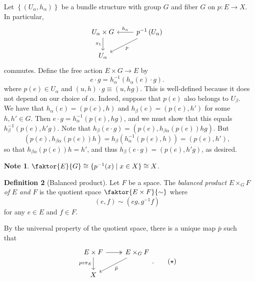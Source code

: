 \documentclass[10pt,letterpaper,cm]{nupset}
\theoremstyle{definition}
\newtheorem{defn}{Definition}[subsection]
\newtheorem{note}[defn]{Note}
\theoremstyle{theorem}
\theoremstyle{remark}
\newcommand{\1}{\mathbb{1}}
\newcommand{\0}{\vec 0}
\begin{document}
Let $\left\{\left(U_{\alpha}, h_{\alpha}\right)\right\}$ be a bundle structure with group $G$ and fiber $G$ on $p: E \to X$. In particular,
\[
\begin{tikzcd}
U_{\alpha}\times G \arrow[d, "\pi_1"'] & p^{-1}\left(U_{\alpha}\right) \arrow[l, "h_{\alpha}"'] \arrow[ld, "p"] \\
U_{\alpha}                             &                                                                                
\end{tikzcd}
\]
commutes. Define the free action $E \times G \to E$ by
\[
e\cdot g = h_{\alpha}^{-1}\left(h_{\alpha}(e)\cdot g\right).
\] where $p(e) \in U_{\alpha}$ and $(u,h) \cdot g \equiv \left(u, hg\right)$. This is well-defined because it does not depend on our choice of $\alpha$. Indeed, suppose that $p(e)$ also belongs to $U_{\beta}$. We have that $h_{\alpha}(e) =\left(p(e), h\right)$ and $h_{\beta}(e) = \left(p(e), h'\right)$ for some $h, h' \in G$. Then $e\cdot g = h_{\alpha}^{-1}\left(p(e), hg\right)$, and we must show that this equals $h_{\beta}^{-1}\left(p(e), h'g\right)$.  Note that $h_{\beta}\left(e\cdot g\right) = \left(p(e), h_{\beta{\alpha}}(p(e))hg\right)$.  But $$\left(p(e), h_{\beta{\alpha}}(p(e))h\right)  =  h_{\beta}\left(h_{\alpha}^{-1}\left(p(e), h\right)\right) = \left(p(e), h'\right),$$ 
so that $h_{\beta{\alpha}}(p(e))h = h'$, and thus $h_{\beta}\left(e\cdot g\right) = \left(p(e), h'g\right)$, as desired.

\begin{note}\label{quot}
$\faktor{E}{G} \cong \{p^{-1}(x) \mid x \in X \} \cong X$.
\end{note}

\begin{defn}[Balanced product]
Let $F$ be a space. The \textit{balanced product $E\times_G F$ of $E$ and $F$} is the quotient space $ \faktor{E\times F}{\sim}$ where $$\left(e, f\right)  \sim \left(eg, g^{-1}f\right)$$
for any $e\in E$ and $f\in F$.
\end{defn}

By the universal property of the quotient space, there is a unique map $\bar{p}$ such that
\[
\begin{tikzcd}
E\times F \arrow[d, "p\circ \pi_E"'] \arrow[r, two heads] & E\times_GF \arrow[ld, "\bar{p}"] \\
X                                                         &                                 
\end{tikzcd}. \label{eq:indmap}  \tag{$\star$}
\]
\end{document}
